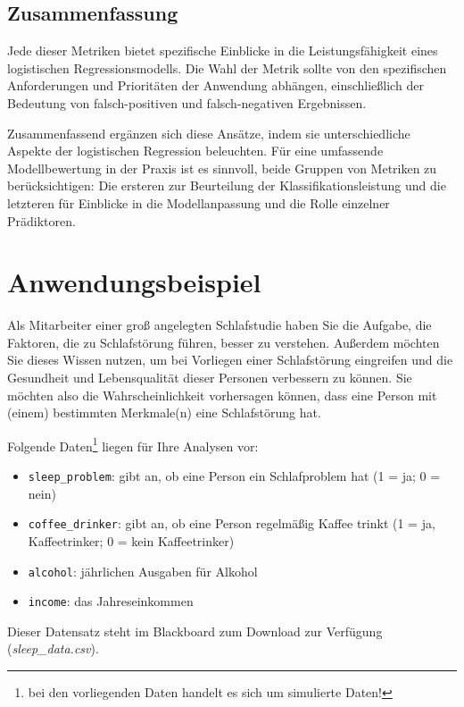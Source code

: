\documentclass[
]{article}
\providecommand{\tightlist}{%
  \setlength{\itemsep}{0pt}\setlength{\parskip}{0pt}}
\begin{document}
\subsection{Zusammenfassung}\label{zusammenfassung}

Jede dieser Metriken bietet spezifische Einblicke in die Leistungsfähigkeit eines logistischen Regressionsmodells. Die Wahl der Metrik sollte von den spezifischen Anforderungen und Prioritäten der Anwendung abhängen, einschließlich der Bedeutung von falsch-positiven und falsch-negativen Ergebnissen.

Zusammenfassend ergänzen sich diese Ansätze, indem sie unterschiedliche Aspekte der logistischen Regression beleuchten. Für eine umfassende Modellbewertung in der Praxis ist es sinnvoll, beide Gruppen von Metriken zu berücksichtigen: Die ersteren zur Beurteilung der Klassifikationsleistung und die letzteren für Einblicke in die Modellanpassung und die Rolle einzelner Prädiktoren.

\section{Anwendungsbeispiel}\label{anwendungsbeispiel}

Als Mitarbeiter einer groß angelegten Schlafstudie haben Sie die Aufgabe, die Faktoren, die zu Schlafstörung führen, besser zu verstehen. Außerdem möchten Sie dieses Wissen nutzen, um bei Vorliegen einer Schlafstörung eingreifen und die Gesundheit und Lebensqualität dieser Personen verbessern zu können. Sie möchten also die Wahrscheinlichkeit vorhersagen können, dass eine Person mit (einem) bestimmten Merkmale(n) eine Schlafstörung hat.

Folgende Daten\footnote{bei den vorliegenden Daten handelt es sich um simulierte Daten!} liegen für Ihre Analysen vor:

\begin{itemize}
\tightlist
\item
  \texttt{sleep\_problem}: gibt an, ob eine Person ein Schlafproblem hat (1 = ja; 0 = nein)
\item
  \texttt{coffee\_drinker}: gibt an, ob eine Person regelmäßig Kaffee trinkt (1 = ja, Kaffeetrinker; 0 = kein Kaffeetrinker)
\item
  \texttt{alcohol}: jährlichen Ausgaben für Alkohol
\item
  \texttt{income}: das Jahreseinkommen
\end{itemize}

Dieser Datensatz steht im Blackboard zum Download zur Verfügung (\emph{sleep\_data.csv}).
\end{document}
